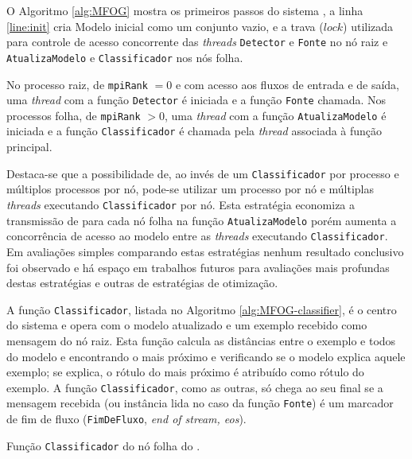 O Algoritmo \ref{alg:MFOG} mostra os primeiros passos do sistema \mfog, a
linha \ref{line:init} cria Modelo inicial como um conjunto vazio, e a trava
($lock$) utilizada para controle de acesso concorrente das \emph{threads}
\texttt{Detector} e \texttt{Fonte} no nó raiz e \texttt{AtualizaModelo} e
\texttt{Classificador} nos nós folha.

No processo raiz, de \texttt{mpiRank} $= 0$ e com acesso aos fluxos de entrada e
de saída, uma \emph{thread} com a função \texttt{Detector} é iniciada e a função
\texttt{Fonte} chamada.
Nos processos folha, de \texttt{mpiRank} $> 0$, uma \emph{thread} com a função
\texttt{AtualizaModelo} é iniciada e a função \texttt{Classificador} é chamada
pela \emph{thread} associada à função principal.

Destaca-se que a possibilidade de, ao invés de um \texttt{Classificador} por
processo e múltiplos processos por nó, pode-se utilizar um processo por nó
e múltiplas \emph{threads} executando \texttt{Classificador} por nó.
Esta estratégia economiza a transmissão de \mclusters para cada nó folha na
função \texttt{AtualizaModelo} porém aumenta a concorrência de acesso ao modelo
entre as \emph{threads} executando \texttt{Classificador}.
Em avaliações simples comparando estas estratégias nenhum resultado conclusivo
foi observado e há espaço em trabalhos futuros para avaliações mais profundas
destas estratégias e outras de estratégias de otimização.

A função \texttt{Classificador}, listada no Algoritmo \ref{alg:MFOG-classifier}, é o
centro do sistema e opera com o modelo atualizado e um exemplo recebido como
mensagem do nó raiz.
Esta função calcula as distâncias entre o exemplo e todos \mclusters do modelo e
encontrando o mais próximo e verificando se o modelo explica aquele exemplo; se
explica, o rótulo do \mcluster mais próximo é atribuído como rótulo do exemplo.
A função \texttt{Classificador}, como as outras, só chega ao seu final se a
mensagem recebida (ou instância lida no caso da função \texttt{Fonte}) é um
marcador de fim de fluxo (\texttt{FimDeFluxo}, \emph{end of stream, eos}).

\begin{algorithm}[htb]
    
\caption{Função \texttt{Classificador} do nó folha do \mfog.}
\label{alg:MFOG-classifier}
\end{algorithm}

